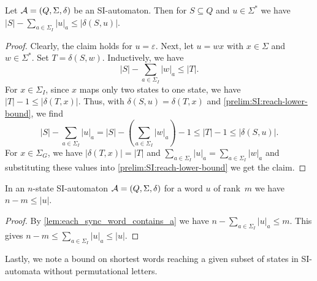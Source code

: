 \begin{lemma} \label{lem:each_sync_word_contains_a}
	Let $\mathcal A = (Q, \Sigma, \delta)$ be an SI-automaton.
	Then for $S \subseteq Q$ and $u \in \Sigma^*$
	we have $|S| - \sum_{a \in \Sigma_I} |u|_a \le |\delta(S, u)|$.
\end{lemma}
\begin{proof}
	Clearly, the claim holds for $u = \varepsilon$.
	Next, let $u = wx$ with $x \in \Sigma$ and $w \in \Sigma^*$.
	Set $T = \delta(S, w)$. Inductively, we have
	\begin{equation} \label{prelim:SI:reach-lower-bound}
		|S| - \sum_{a \in \Sigma_I} |w|_a \le |T|.		
	\end{equation}
	For $x \in \Sigma_I$,
	since $x$ maps only two states to one state,
	we have $|T| - 1 \le |\delta(T,x)|$.
	Thus, with $\delta(S, u) = \delta(T,x)$ and \cref{prelim:SI:reach-lower-bound}, we find
	\[
	|S| - \sum_{a \in \Sigma_I} |u|_a
	= |S| - \left( \sum_{a \in \Sigma_I} |w|_a \right) - 1
	\le |T| - 1
	\le |\delta(S, u)|.
	\]
	For $x \in \Sigma_G$,
	we have $|\delta(T, x)| = |T|$
	and $\sum_{a \in \Sigma_I} |u|_a = \sum_{a \in \Sigma_I} |w|_a$
	and substituting these values into \cref{prelim:SI:reach-lower-bound}
	we get the claim.
\end{proof}

\begin{corollary} \label{cor:each_sync_word_contains_a}
	In an $n$-state SI-automaton  $\mathcal A = (Q, \Sigma, \delta)$ for a
	word $u$ of rank~$m$
	we have $n - m \le |u|$. 
\end{corollary}
\begin{proof}
	By \cref{lem:each_sync_word_contains_a} we have $n - \sum_{a \in \Sigma_I} |u|_a \le m$.
	This gives $n - m \le \sum_{a \in \Sigma_I} |u|_a \le |u|$.	
\end{proof}

Lastly, we note a bound on shortest words reaching a given subset of states
in SI-automata without permutational letters.

